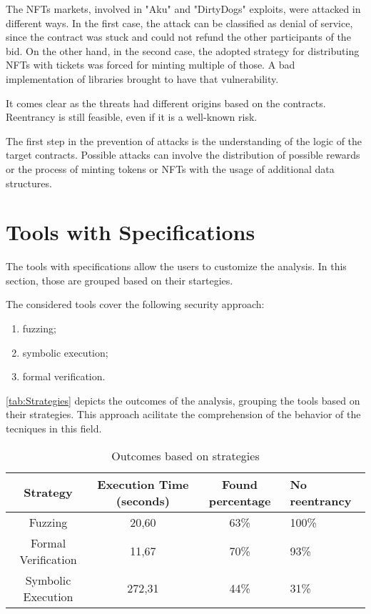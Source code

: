 The NFTs markets, involved in "Aku" and "DirtyDogs" exploits, were attacked in different ways. 
In the first case, the attack can be classified as denial of service, since the contract was stuck and could not refund the other participants of the bid.
On the other hand, in the second case, the adopted strategy for distributing NFTs with tickets was forced for minting multiple of those. A bad implementation of libraries brought to have that vulnerability. 

It comes clear as the threats had different origins based on the contracts.
Reentrancy is still feasible, even if it is a well-known risk.

The first step in the prevention of attacks is the understanding of the logic of the target contracts. 
Possible attacks can involve the distribution of possible rewards or the process of minting tokens or NFTs with the usage of additional data structures. 



\section{Tools with Specifications}
The tools with specifications allow the users to customize the analysis. 
In this section, those are grouped based on their startegies. 

The considered tools cover the following security approach:
\begin{enumerate}
    \item fuzzing;
    \item symbolic execution;
    \item formal verification. 
\end{enumerate} 

\autoref{tab:Strategies} depicts the outcomes of the analysis, grouping the tools based on their strategies. 
This approach acilitate the comprehension of the behavior of the tecniques in this field.

\begin{center}
    \begin{table*}
        \caption{Outcomes based on strategies}
                \label{tab:Strategies}
                \begin{tabular}{cccl}
                \toprule
                    Strategy & Execution Time (seconds) & Found percentage & No reentrancy\\
                    \midrule
                    Fuzzing & 20,60 & 63\% & 100\% \\ 
                    Formal Verification  & 11,67 & 70\% & 93\% \\ 
                    Symbolic Execution & 272,31  & 44\% & 31\% \\ 
                \bottomrule
        \end{tabular}
    \end{table*}
    
\end{center}


